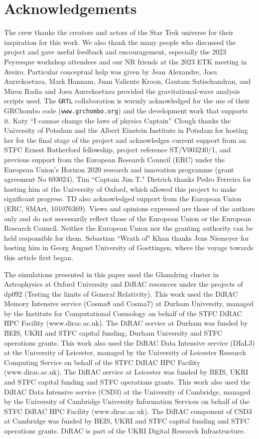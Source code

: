\documentclass[twocolumn, numberedappendix, twocolappendix,apj, iop, a4paper]{openjournal}
\begin{document}
\section{Acknowledgements}
The crew thanks the creators and actors of the Star Trek universe for their inspiration for this work. We also thank the many people who discussed the project and gave useful feedback and encouragement, especially the 2023 Peyresque workshop attendees and our NR friends at the 2023 ETK meeting in Aveiro.  Particular conceptual help was given by Jean Alexandre, Josu Aurrekoetxea, Mark Hannam, Juan Valiente Kroon, Gautam Satischandran, and Miren Radia and Josu Aurrekoetxea provided the gravitational-wave analysis scripts used. The \texttt{GRTL} collaboration is warmly acknowledged for the use of their GRChombo code (\texttt{www.grchombo.org}) and the development work that supports it.
Katy ``I cannae change the laws of physics Captain'' Clough thanks the University of Potsdam and the Albert Einstein Institute in Potsdam for hosting her for the final stage of the project and acknowledges current support from an STFC Ernest Rutherford fellowship, project reference ST/V003240/1, and previous support from the European Research Council (ERC) under the European Union’s Horizon 2020 research and innovation programme (grant agreement No 693024). Tim ``Captain Jim T." Dietrich thanks Pedro Ferreira for hosting him at the University of Oxford, which allowed this project to make significant progress. TD also acknowledged support from the European Union (ERC, SMArt, 101076369). Views and opinions expressed are those of the authors only and do not necessarily reflect those of the European Union or the European Research Council. Neither the European Union nor the granting authority can be held responsible for them.
Sebastian ``Wrath of" Khan thanks Jens Niemeyer for hosting him in Georg August University of Goettingen, where the voyage towards this article first began. 

The simulations presented in this paper used the Glamdring cluster in Astrophysics at Oxford University and DiRAC resources under the projects of dp092 (Testing the limits of General Relativity). This work used the DiRAC Memory Intensive service (Cosma8 and Cosma7) at Durham University, managed by the Institute for Computational Cosmology on behalf of the STFC DiRAC HPC Facility (www.dirac.ac.uk). The DiRAC service at Durham was funded by BEIS, UKRI and STFC capital funding, Durham University and STFC operations grants. This work also used the DiRAC Data Intensive service (DIaL3) at the University of Leicester, managed by the University of Leicester Research Computing Service on behalf of the STFC DiRAC HPC Facility (www.dirac.ac.uk). The DiRAC service at Leicester was funded by BEIS, UKRI and STFC capital funding and STFC operations grants. This work also used the DiRAC Data Intensive service (CSD3) at the University of Cambridge, managed by the University of Cambridge University Information Services on behalf of the STFC DiRAC HPC Facility (www.dirac.ac.uk). The DiRAC component of CSD3 at Cambridge was funded by BEIS, UKRI and STFC capital funding and STFC operations grants. DiRAC is part of the UKRI Digital Research Infrastructure.
\end{document}
